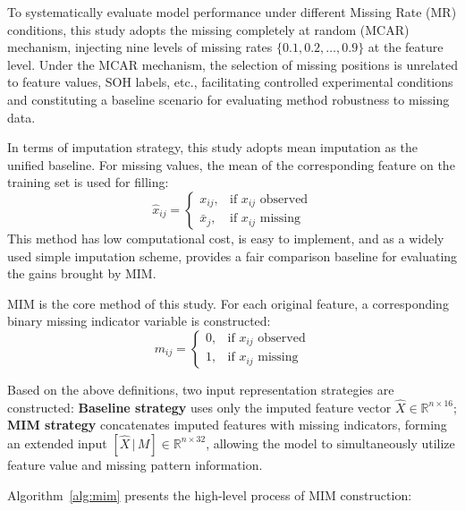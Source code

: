 \documentclass[10pt,a4paper]{article}
\begin{document}
To systematically evaluate model performance under different Missing Rate (MR) conditions, this study adopts the missing completely at random (MCAR) mechanism, injecting nine levels of missing rates $\{0.1, 0.2, \ldots, 0.9\}$ at the feature level. Under the MCAR mechanism, the selection of missing positions is unrelated to feature values, SOH labels, etc., facilitating controlled experimental conditions and constituting a baseline scenario for evaluating method robustness to missing data.

In terms of imputation strategy, this study adopts mean imputation as the unified baseline. For missing values, the mean of the corresponding feature on the training set is used for filling:
\begin{equation}
    \hat{x}_{ij} = \begin{cases}
        x_{ij}, & \text{if } x_{ij} \text{ observed} \\
        \bar{x}_j, & \text{if } x_{ij} \text{ missing}
    \end{cases}
\end{equation}
This method has low computational cost, is easy to implement, and as a widely used simple imputation scheme, provides a fair comparison baseline for evaluating the gains brought by MIM.

MIM is the core method of this study. For each original feature, a corresponding binary missing indicator variable is constructed:
\begin{equation}
    m_{ij} = 
    \begin{cases}
        0, & \text{if } x_{ij} \text{ observed} \\
        1, & \text{if } x_{ij} \text{ missing}
    \end{cases}
\end{equation}

Based on the above definitions, two input representation strategies are constructed: \textbf{Baseline strategy} uses only the imputed feature vector $\hat{X} \in \mathbb{R}^{n \times 16}$; \textbf{MIM strategy} concatenates imputed features with missing indicators, forming an extended input $[\hat{X} \,|\, M] \in \mathbb{R}^{n \times 32}$, allowing the model to simultaneously utilize feature value and missing pattern information.

Algorithm~\ref{alg:mim} presents the high-level process of MIM construction:
\end{document}
